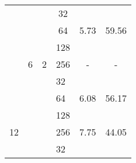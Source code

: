 \begin{longtable}{cccccc}
                      & {  }                                            & {  }                                            & \cellcolor[HTML]{EFEFEF}32                      & \cellcolor[HTML]{EFEFEF}{  6.49}     & \cellcolor[HTML]{EFEFEF}{  52.64}    \\
                      & {  }                                            & {  }                                            & 64                                              & {  5.73}                             & {  59.56}                            \\
                      & {  }                                            & {  }                                            & \cellcolor[HTML]{EFEFEF}128                     & \cellcolor[HTML]{EFEFEF}{  -} & \cellcolor[HTML]{EFEFEF}{  -} \\
                      & \multirow{-4}{*}{{  6}}                         & \multirow{-4}{*}{{  2}}                         & 256                                             & {  -}                         & {  -}                         \\ \cline{2-6}
                      & \cellcolor[HTML]{EFEFEF}{  }                    & \cellcolor[HTML]{EFEFEF}{  }                    & \multicolumn{1}{l}{\cellcolor[HTML]{EFEFEF}32}  & \cellcolor[HTML]{EFEFEF}{  6.65}     & \cellcolor[HTML]{EFEFEF}{  51.35}    \\
                      & \cellcolor[HTML]{EFEFEF}{  }                    & \cellcolor[HTML]{EFEFEF}{  }                    & \multicolumn{1}{l}{64}                          & {  6.08}                             & {  56.17}                            \\
                      & \cellcolor[HTML]{EFEFEF}{  }                    & \cellcolor[HTML]{EFEFEF}{  }                    & \multicolumn{1}{l}{\cellcolor[HTML]{EFEFEF}128} & \cellcolor[HTML]{EFEFEF}{  6.46}     & \cellcolor[HTML]{EFEFEF}{  52.87}    \\
\multirow{-24}{*}{12} & \multirow{-4}{*}{\cellcolor[HTML]{EFEFEF}{  1}} & \multirow{-4}{*}{\cellcolor[HTML]{EFEFEF}{  12}}& \multicolumn{1}{l}{256}                         & {  7.75}                             & {  44.05}                            \\ \hline
                      & {  }                                            & {  }                                            & \multicolumn{1}{l}{\cellcolor[HTML]{EFEFEF}32}  & \cellcolor[HTML]{EFEFEF}{  5.31}     & \cellcolor[HTML]{EFEFEF}{  64.37}    \\

\end{longtable}
